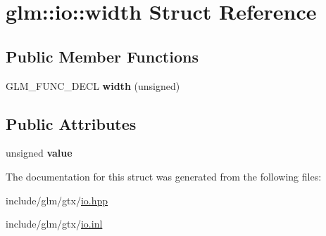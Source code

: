 \hypertarget{structglm_1_1io_1_1width}{}\section{glm\+:\+:io\+:\+:width Struct Reference}
\label{structglm_1_1io_1_1width}
\subsection*{Public Member Functions}
\begin{DoxyCompactItemize}
\item 
\mbox{\label{structglm_1_1io_1_1width_a1576674b7e08dc5014ce4f41ac6eea5b}} 
G\+L\+M\+\_\+\+F\+U\+N\+C\+\_\+\+D\+E\+CL {\bfseries width} (unsigned)
\end{DoxyCompactItemize}
\subsection*{Public Attributes}
\begin{DoxyCompactItemize}
\item 
\mbox{\label{structglm_1_1io_1_1width_a6bf1338eb947811d36ec93bd2e9b8425}} 
unsigned {\bfseries value}
\end{DoxyCompactItemize}


The documentation for this struct was generated from the following files\+:\begin{DoxyCompactItemize}
\item 
include/glm/gtx/\hyperlink{io_8hpp}{io.\+hpp}\item 
include/glm/gtx/\hyperlink{io_8inl}{io.\+inl}\end{DoxyCompactItemize}
